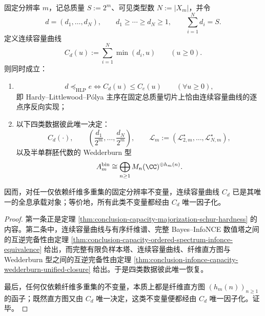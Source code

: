 \begin{theorem}[连续容量曲线的序理论封口与有限分辨率全息普适性]\label{thm:conclusion-capacity-curve-order-holography-universality}
固定分辨率 \(m\)，记总质量 \(S:=2^m\)、可见类型数 \(N:=|X_m|\)，并令
\[
d=(d_1,\dots,d_N),
\qquad
d_1\ge \cdots \ge d_N\ge 1,
\qquad
\sum_{i=1}^{N}d_i=S.
\]
定义连续容量曲线
\[
C_d(u):=\sum_{i=1}^{N}\min(d_i,u)
\qquad (u\ge 0).
\]
则同时成立：
\begin{enumerate}
  \item
  \[
  d\preceq_{\mathrm{HLP}} e
  \iff
  C_d(u)\le C_e(u)
  \qquad (\forall u\ge 0),
  \]
  即 Hardy--Littlewood--P\'olya 主序在固定总质量切片上恰由连续容量曲线的逐点序反向实现；
  \item 以下四类数据彼此唯一决定：
  \[
  C_d(\cdot),
  \qquad
  \left(\frac{d_1}{2^m},\dots,\frac{d_N}{2^m}\right),
  \qquad
  \mathscr L_m:=
  (\mathcal L_{2,m}^{\star},\dots,\mathcal L_{N,m}^{\star}),
  \]
  以及半单群胚代数的 Wedderburn 型
  \[
  A_m^{\mathrm{bin}}\cong \bigoplus_{n\ge 1}M_n(\CC)^{\oplus h_m(n)}.
  \]
\end{enumerate}
因而，对任一仅依赖纤维多重集的固定分辨率不变量，连续容量曲线 \(C_d\) 已是其唯一的全息承载对象；等价地，所有此类不变量都经由 \(C_d\) 唯一因子化。
\end{theorem}
\begin{proof}
第一条正是定理 \ref{thm:conclusion-capacity-majorization-schur-hardness} 的内容。第二条中，连续容量曲线与有序纤维谱、完整 Bayes--InfoNCE 数值塔之间的互逆完备性由定理 \ref{thm:conclusion-capacity-ordered-spectrum-infonce-equivalence} 给出，而完整有限负样本塔、连续容量曲线、纤维直方图与 Wedderburn 型之间的互逆完备性由定理 \ref{thm:conclusion-infonce-capacity-wedderburn-unified-closure} 给出。于是四类数据彼此唯一恢复。

最后，任何仅依赖纤维多重集的不变量，本质上都是纤维直方图 \((h_m(n))_{n\ge 1}\) 的函子；既然直方图又由 \(C_d\) 唯一决定，这类不变量便都经由 \(C_d\) 唯一因子化。证毕。
\end{proof}

